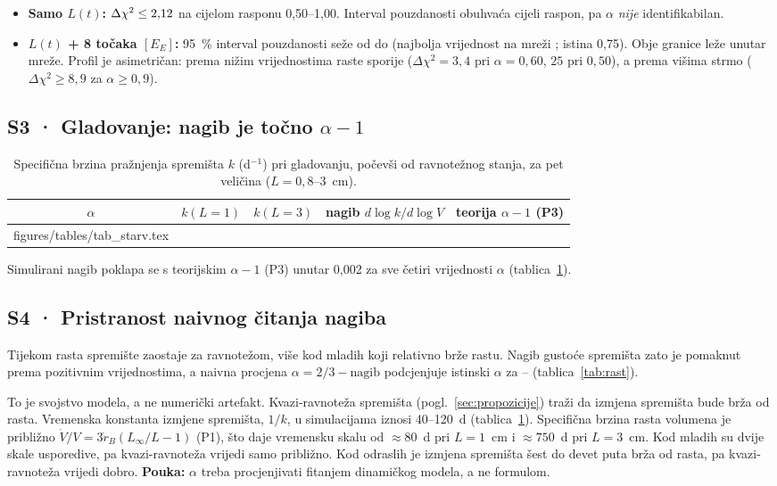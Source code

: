 \begin{itemize}
\item \textbf{Samo $L(t)$:} $\Delta\chi^2\le2{,}12$ na cijelom rasponu 0,50–1,00. Interval pouzdanosti obuhvaća cijeli raspon, pa $\alpha$ \emph{nije} identifikabilan.
\item \textbf{$L(t)$ + 8 točaka $[E_E]$:} 95~\% interval pouzdanosti seže od \CIlo{} do \CIhi{} (najbolja vrijednost na mreži \AlphaBestProf; istina 0,75). Obje granice leže unutar mreže. Profil je asimetričan: prema nižim vrijednostima raste sporije ($\Delta\chi^2=3{,}4$ pri $\alpha=0{,}60$, $25$ pri $0{,}50$), a prema višima strmo ($\Delta\chi^2\ge8{,}9$ za $\alpha\ge0{,}9$).
\end{itemize}

\subsection{S3 · Gladovanje: nagib je točno $\alpha-1$}

\begin{table}[ht]
\centering\small
\caption{Specifična brzina pražnjenja spremišta $k$ (d$^{-1}$) pri gladovanju, počevši od ravnotežnog stanja, za pet veličina ($L=0{,}8$–$3$~cm).}
\label{tab:gladovanje}
\begin{tabular}{@{}ccccc@{}}
\toprule
$\alpha$ & $k(L=1)$ & $k(L=3)$ & nagib $d\log k/d\log V$ & teorija $\alpha-1$ (P3) \\
\midrule
{} figures/tables/tab_starv.tex
\bottomrule
\end{tabular}
\end{table}

Simulirani nagib poklapa se s teorijskim $\alpha-1$ (P3) unutar 0,002 za sve četiri vrijednosti $\alpha$ (tablica~\ref{tab:gladovanje}).

\subsection{S4 · Pristranost naivnog čitanja nagiba}

Tijekom rasta spremište zaostaje za ravnotežom, više kod mladih koji relativno brže rastu. Nagib gustoće spremišta zato je pomaknut prema pozitivnim vrijednostima, a naivna procjena $\alpha=2/3-\text{nagib}$ podcjenjuje istinski $\alpha$ za \NaiveBiasMin–\NaiveBiasMax{} (tablica~\ref{tab:rast}).

To je svojstvo modela, a ne numerički artefakt. Kvazi-ravnoteža spremišta (pogl.~\ref{sec:propozicije}) traži da izmjena spremišta bude brža od rasta. Vremenska konstanta izmjene spremišta, $1/k$, u simulacijama iznosi 40–120~d (tablica~\ref{tab:gladovanje}). Specifična brzina rasta volumena je približno $\dot V/V=3\dot r_B(L_\infty/L-1)$ (P1), što daje vremensku skalu od $\approx80$~d pri $L=1$~cm i $\approx750$~d pri $L=3$~cm. Kod mladih su dvije skale usporedive, pa kvazi-ravnoteža vrijedi samo približno. Kod odraslih je izmjena spremišta šest do devet puta brža od rasta, pa kvazi-ravnoteža vrijedi dobro. \textbf{Pouka:} $\alpha$ treba procjenjivati fitanjem dinamičkog modela, a ne formulom.

